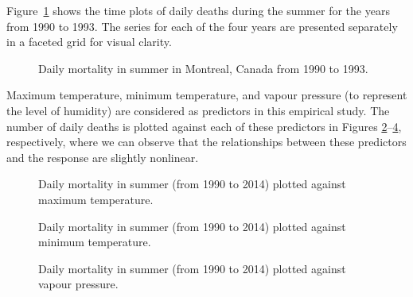 \documentclass[
  11pt,
  a4paper,
]{article}
\begin{document}
Figure~\ref{fig-deaths} shows the time plots of daily deaths during the
summer for the years from 1990 to 1993. The series for each of the four
years are presented separately in a faceted grid for visual clarity.

\begin{figure}


\caption{\label{fig-deaths}Daily mortality in summer in Montreal, Canada
from 1990 to 1993.}

\end{figure}%

Maximum temperature, minimum temperature, and vapour pressure (to
represent the level of humidity) are considered as predictors in this
empirical study. The number of daily deaths is plotted against each of
these predictors in Figures \ref{fig-Tmax}--\ref{fig-Vp}, respectively,
where we can observe that the relationships between these predictors and
the response are slightly nonlinear.

\begin{figure}


\caption{\label{fig-Tmax}Daily mortality in summer (from 1990 to 2014)
plotted against maximum temperature.}

\end{figure}%

\begin{figure}


\caption{\label{fig-Tmin}Daily mortality in summer (from 1990 to 2014)
plotted against minimum temperature.}

\end{figure}%

\begin{figure}


\caption{\label{fig-Vp}Daily mortality in summer (from 1990 to 2014)
plotted against vapour pressure.}

\end{figure}%
\end{document}
